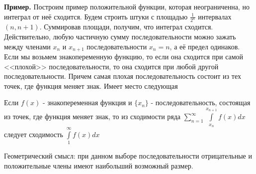 \textbf{Пример.}
Построим пример положительной функции, которая неограниченна, но интеграл
от неё сходится. Будем строить штуки с площадью $\frac{1}{2^n}$ 
интервалах $(n,n+1)$. Суммировав площади, получим, что интеграл сходится.\\
Действительно, любую частичную сумму последовательности можно 
зажать между членами $x_{n}$ и $x_{n+1}$ последовательности $x_n=n$, а 
её предел одинаков.\\
Если мы возьмем знакопеременную функцию, то если она сходится при самой 
<<плохой>> последовательности, то она сходится при любой другой 
последовательности. Причем самая плохая последовательность состоит из тех 
точек, где функция меняет знак. Имеет место следующая
\begin{theor}
    Если $f(x)$ - знакопеременная функция и  $\{x_n\}$ - последовательность,
    состоящая из точек, где функция меняет знак, то из сходимости ряда
    $\sum\limits_{n=1}^{\infty} \int\limits_{x_n}^{x_{n+1}}f(x)dx$ 
    следует сходимость $\int\limits_{1}^{\infty}f(x)dx$
\end{theor}
Геометрический смысл: при данном выборе последовательности отрицательные и 
положительные члены имеют наибольший возможный размер. 

